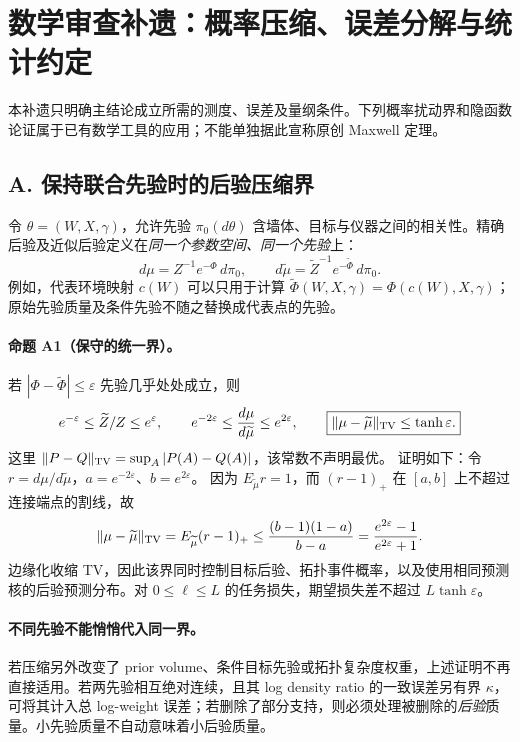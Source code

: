 \section*{数学审查补遗：概率压缩、误差分解与统计约定}

本补遗只明确主结论成立所需的测度、误差及量纲条件。下列概率扰动界和隐函数论证属于已有数学工具的应用；不能单独据此宣称原创 Maxwell 定理。

\subsection*{A. 保持联合先验时的后验压缩界}

令 $\theta=(W,X,\gamma)$，允许先验 $\pi_0(d\theta)$ 含墙体、目标与仪器之间的相关性。精确后验及近似后验定义在\emph{同一个参数空间、同一个先验}上：
\[
 d\mu=Z^{-1}e^{-\Phi}\,d\pi_0,
 \qquad d\widetilde\mu=\widetilde Z^{-1}e^{-\widetilde\Phi}\,d\pi_0.
\]
例如，代表环境映射 $c(W)$ 可以只用于计算
$\widetilde\Phi(W,X,\gamma)=\Phi(c(W),X,\gamma)$；原始先验质量及条件先验不随之替换成代表点的先验。

\paragraph{命题 A1（保守的统一界）。}
若 $|\Phi-\widetilde\Phi|\le\varepsilon$ 先验几乎处处成立，则
\[
 e^{-\varepsilon}\le \widetilde Z/Z\le e^{\varepsilon},\qquad
 e^{-2\varepsilon}\le \frac{d\mu}{d\widetilde\mu}\le e^{2\varepsilon},
 \qquad
 \boxed{\lVert\mu-\widetilde\mu\rVert_{\rm TV}\le\tanh\varepsilon.}
\]
这里 $\lVert P-Q\rVert_{\rm TV}=\sup_A|P(A)-Q(A)|$，该常数不声明最优。
证明如下：令 $r=d\mu/d\widetilde\mu$，$a=e^{-2\varepsilon}$、$b=e^{2\varepsilon}$。
因为 $E_{\widetilde\mu}r=1$，而 $(r-1)_+$ 在 $[a,b]$ 上不超过连接端点的割线，故
\[
 \lVert\mu-\widetilde\mu\rVert_{\rm TV}
 =E_{\widetilde\mu}(r-1)_+
 \le\frac{(b-1)(1-a)}{b-a}
 =\frac{e^{2\varepsilon}-1}{e^{2\varepsilon}+1}.
\]
边缘化收缩 TV，因此该界同时控制目标后验、拓扑事件概率，以及使用相同预测核的后验预测分布。对 $0\le\ell\le L$ 的任务损失，期望损失差不超过 $L\tanh\varepsilon$。

\paragraph{不同先验不能悄悄代入同一界。}
若压缩另外改变了 prior volume、条件目标先验或拓扑复杂度权重，上述证明不再直接适用。若两先验相互绝对连续，且其 log density ratio 的一致误差另有界 $\kappa$，可将其计入总 log-weight 误差；若删除了部分支持，则必须处理被删除的\emph{后验}质量。小先验质量不自动意味着小后验质量。

